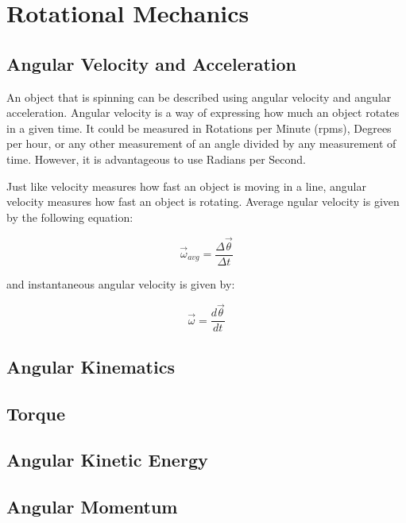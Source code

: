 \chapter{Rotational Mechanics}
	\section{Angular Velocity and Acceleration}
	An object that is spinning can be described using angular velocity and angular acceleration.  Angular velocity is a way of expressing how much an object rotates in a given time.  It could be measured in Rotations per Minute (rpms), Degrees per hour, or any other measurement of an angle divided by any measurement of time.  However, it is advantageous to use Radians per Second.
	
	  Just like velocity measures how fast an object is moving in a line, angular velocity measures how fast an object is rotating.    Average ngular velocity is given by the following equation:
	  	\begin{mdframed}[backgroundcolor=orange!20!white]
	  \begin{equation}
		\vec{\omega}_{avg} = \frac{\Delta \vec{\theta}}{\Delta t}
	  \end{equation}
	\end{mdframed}
	and instantaneous angular velocity is given by: 
	  	\begin{mdframed}[backgroundcolor=orange!20!white]
	\begin{equation}
	\vec{\omega} = \frac{d \vec{\theta}}{d t}
	\end{equation}
\end{mdframed}


	\section{Angular Kinematics}
	\section{Torque}
	\section{Angular Kinetic Energy}
	\section{Angular Momentum}
	
	

		


	



